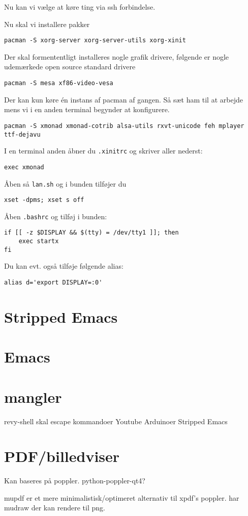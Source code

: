 \documentclass[10pt,a4paper,danish]{article}
\begin{document}
Nu kan vi vælge at køre ting via ssh forbindelse.


Nu skal vi installere pakker
\begin{verbatim}
pacman -S xorg-server xorg-server-utils xorg-xinit
\end{verbatim}

Der skal formententligt installeres nogle grafik drivere, følgende er nogle
udemærkede open source standard drivere

\begin{verbatim}
pacman -S mesa xf86-video-vesa
\end{verbatim}

Der kan kun køre én instans af pacman af gangen.
Så sæt ham til at arbejde mens vi i en anden terminal begynder at konfigurere.
\begin{verbatim}
pacman -S xmonad xmonad-cotrib alsa-utils rxvt-unicode feh mplayer ttf-dejavu
\end{verbatim}

I en terminal anden åbner du \texttt{.xinitrc} og skriver aller nederst:
\begin{verbatim}
exec xmonad
\end{verbatim}

Åben så \texttt{lan.sh} og i bunden tilføjer du
\begin{verbatim}
xset -dpms; xset s off
\end{verbatim}

Åben \texttt{.bashrc} og tilføj i bunden:
\begin{verbatim}
if [[ -z $DISPLAY && $(tty) = /dev/tty1 ]]; then
    exec startx
fi
\end{verbatim}
Du kan evt. også tilføje følgende alias:
\begin{verbatim}
alias d='export DISPLAY=:0'
\end{verbatim}

\section{Stripped Emacs}
\section{Emacs}
\section{mangler}
revy-shell skal escape kommandoer
Youtube
Arduinoer
Stripped Emacs


\section{PDF/billedviser}
Kan baseres på poppler.
python-poppler-qt4?

mupdf er et mere minimalistisk/optimeret alternativ til xpdf's poppler.
har mudraw der kan rendere til png.
\end{document}
